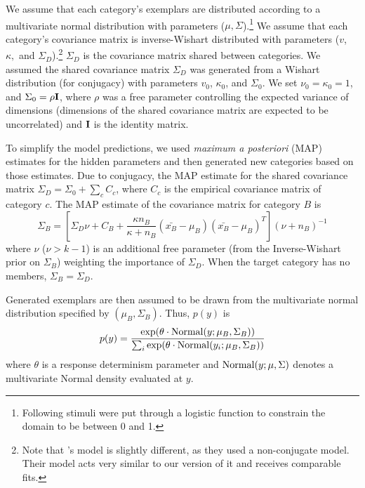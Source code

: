 \documentclass[10pt,letterpaper]{article}
\begin{document}
We assume that each category's exemplars are distributed according to a multivariate normal distribution with parameters ($\mu, \Sigma$).\footnote{Following \citet{jern2013probabilistic} stimuli were put through a logistic function to constrain the domain to be between 0 and 1.} We assume that each category's covariance matrix is inverse-Wishart distributed with parameters ($v$, $\kappa,$ and $\Sigma_D$).\footnote{Note that \citet{jern2013probabilistic}'s model is slightly different, as they used a non-conjugate model. Their model acts very similar to our version of it and receives comparable fits.} $\Sigma_D$ is the covariance matrix shared between categories. We assumed the shared covariance matrix $\Sigma_D$ was generated from a Wishart distribution (for conjugacy) with parameters $v_0$, $\kappa_0$, and $\Sigma_0$. We set $\nu_0 = \kappa_0 = 1$, and $\Sigma_0 = \rho {\bf I}$, where $\rho$ was a free parameter controlling the expected variance of dimensions (dimensions of the shared covariance matrix are expected to be uncorrelated) and ${\bf I}$ is the identity matrix.

To simplify the model predictions, we used {\em maximum a posteriori} (MAP) estimates for the hidden parameters and then generated new categories based on those estimates. Due to conjugacy, the MAP estimate for the shared covariance matrix $\Sigma_D = \Sigma_0 + \sum_c{C_c}$, where $C_c$ is the empirical covariance matrix of category $c$. The MAP estimate of the covariance matrix for category $B$ is 
\begin{equation}
  \Sigma_B = \left[ \Sigma_D \nu + C_B +
    \dfrac
    {\kappa n_B}
    {\kappa + n_B}
    (\bar{x_B}-\mu_B)(\bar{x_B}-\mu_B)^T
  \right] (\nu + n_B)^{-1}
  \label{eq:Sigma_B}
\end{equation}
%
where $\nu$ ($\nu>k-1$) is an additional free parameter (from the Inverse-Wishart prior on $\Sigma_B$) weighting the importance of $\Sigma_{D}$. When the target category has no members, $\Sigma_B = \Sigma_D$.

Generated exemplars are then assumed to be drawn from the multivariate normal distribution specified by $(\mu_{B}, \Sigma_{B})$. Thus, $p(y)$ is
\begin{equation}
  p(y) = \dfrac
    {\exp( \theta \cdot {\rm Normal}(y; \mu_{B}, \Sigma_{B}))}
    {\sum_i \exp( \theta \cdot {\rm Normal}(y_i; \mu_{B}, \Sigma_{B}))} 
\end{equation}
where $\theta$ is a response determinism parameter and ${\rm Normal}(y; \mu, \Sigma)$ denotes a multivariate Normal density evaluated at $y$.
\end{document}
